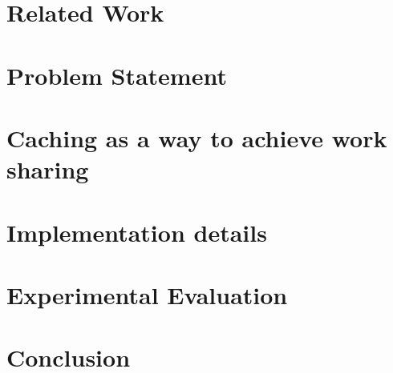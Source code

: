 \documentclass{acmsig}
\begin{document}
\section{Related Work}
\label{sec:related}


\section{Problem Statement}
\label{sec:problem}


\section{Caching as a way to achieve work sharing}
\label{sec:caching}


\section{Implementation details}
\label{sec:implementation}


\section{Experimental Evaluation}
\label{sec:evaluation}


\section{Conclusion}
\label{sec:conclusion}





\end{document}
